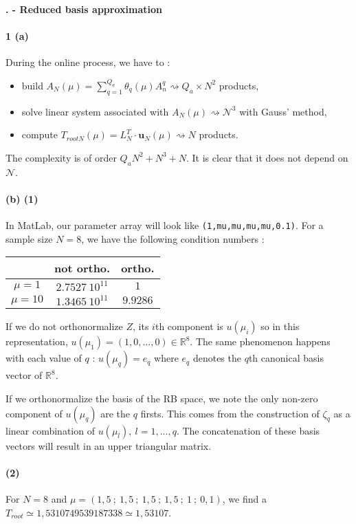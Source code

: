 \documentclass[a4paper]{article}
\newcounter{c}
\newcounter{d}
\newcounter{r}
\newcounter{e}
\newcounter{sujet}
\newcommand{\chapitre}[1]{\stepcounter{c}\setcounter{e}{0}\setcounter{d}{0}\setcounter{r}{0}\bigskip\noindent\textbf{\Large\arabic{sujet}.\Roman{c} - #1}\\}
\newcommand{\R}{\mathbb{R}}
\newcommand{\bu}{\mathbf u}
\begin{document}
\newpage
\setcounter{c}{0}

\chapitre{Reduced basis approximation}

\paragraph{1 (a)}During the online process, we have to :
\begin{itemize}
\item build $A_N(\mu) = \displaystyle\sum_{q=1}^{Q_a}\theta_q(\mu)A_n^q\rightsquigarrow Q_a\times N^2$ products,
\item solve linear system associated with $A_N(\mu)\rightsquigarrow\mathcal N^3$ with Gauss' method,
\item compute $T_{root N}(\mu) = L_N^T\cdot \bu_N(\mu)\rightsquigarrow N$ products.
\end{itemize}

The complexity is of order $Q_aN^2+N^3+N$. It is clear that it does not depend on $\mathcal N$.

\paragraph{(b) (1)}In MatLab, our parameter array will look like {\tt(1,mu,mu,mu,mu,0.1)}.  For a sample size $N=8$, we have the following condition numbers : \begin{center}\begin{tabular}{|c|c|c|}\hline& not ortho.&ortho.\\\hline$\mu=1$&$2.7527~10^{11}$&$1$\\\hline$\mu=10$&$1.3465~10^{11}$&$9.9286$\\\hline\end{tabular}\end{center}

If we do not orthonormalize $Z$, its $i$th component is $u(\mu_i)$ so in this representation, $u(\mu_1)=(1,0,...,0)\in\R^8$. The same phenomenon happens with each value of $q$ : $u(\mu_q)=e_q$ where $e_q$ denotes the $q$th canonical basis vector of $\R^8$.


If we orthonormalize the basis of the RB space, we note the only non-zero component of $u(\mu_q)$ are the $q$ firsts. This comes from the construction of $\zeta_q$ as a linear combination of $u(\mu_l),~l=1,...,q$. The concatenation of these basis vectors will result in an upper triangular matrix.

\paragraph{(2)} For $N=8$ and $\mu = (1,5~;~1,5~;~1,5~;~1,5~;~1~;~0,1)$, we find a $T_{root}\simeq  1,5310749539187338\simeq  1,53107$.
\end{document}
